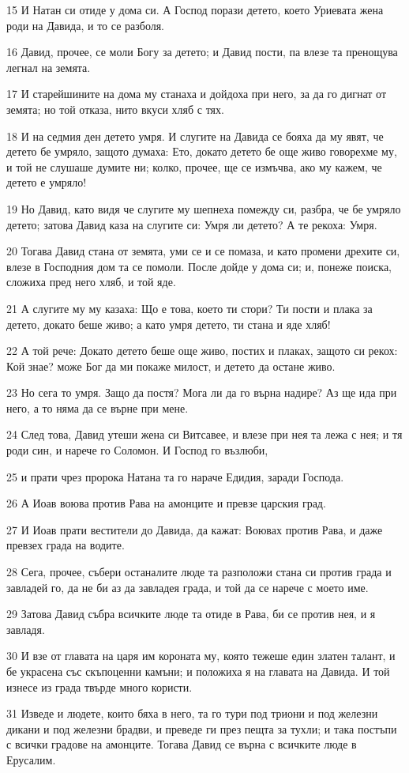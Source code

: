 \par 15 И Натан си отиде у дома си. А Господ порази детето, което Уриевата жена роди на Давида, и то се разболя.
\par 16 Давид, прочее, се моли Богу за детето; и Давид пости, па влезе та пренощува легнал на земята.
\par 17 И старейшините на дома му станаха и дойдоха при него, за да го дигнат от земята; но той отказа, нито вкуси хляб с тях.
\par 18 И на седмия ден детето умря. И слугите на Давида се бояха да му явят, че детето бе умряло, защото думаха: Ето, докато детето бе още живо говорехме му, и той не слушаше думите ни; колко, прочее, ще се измъчва, ако му кажем, че детето е умряло!
\par 19 Но Давид, като видя че слугите му шепнеха помежду си, разбра, че бе умряло детето; затова Давид каза на слугите си: Умря ли детето? А те рекоха: Умря.
\par 20 Тогава Давид стана от земята, уми се и се помаза, и като промени дрехите си, влезе в Господния дом та се помоли. После дойде у дома си; и, понеже поиска, сложиха пред него хляб, и той яде.
\par 21 А слугите му му казаха: Що е това, което ти стори? Ти пости и плака за детето, докато беше живо; а като умря детето, ти стана и яде хляб!
\par 22 А той рече: Докато детето беше още живо, постих и плаках, защото си рекох: Кой знае? може Бог да ми покаже милост, и детето да остане живо.
\par 23 Но сега то умря. Защо да постя? Мога ли да го върна надире? Аз ще ида при него, а то няма да се върне при мене.
\par 24 След това, Давид утеши жена си Витсавее, и влезе при нея та лежа с нея; и тя роди син, и нарече го Соломон. И Господ го възлюби,
\par 25 и прати чрез пророка Натана та го нараче Едидия, заради Господа.
\par 26 А Иоав воюва против Рава на амонците и превзе царския град.
\par 27 И Иоав прати вестители до Давида, да кажат: Воювах против Рава, и даже превзех града на водите.
\par 28 Сега, прочее, събери останалите люде та разположи стана си против града и завладей го, да не би аз да завладея града, и той да се нарече с моето име.
\par 29 Затова Давид събра всичките люде та отиде в Рава, би се против нея, и я завладя.
\par 30 И взе от главата на царя им короната му, която тежеше един златен талант, и бе украсена със скъпоценни камъни; и положиха я на главата на Давида. И той изнесе из града твърде много користи.
\par 31 Изведе и людете, които бяха в него, та го тури под триони и под железни дикани и под железни брадви, и преведе ги през пещта за тухли; и така постъпи с всички градове на амонците. Тогава Давид се върна с всичките люде в Ерусалим.

